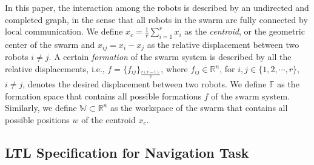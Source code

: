 \documentclass[letterpaper, 10 pt, conference]{ieeeconf}
\begin{document}
In this paper, the interaction among the robots is described by an undirected and completed graph, in the sense that all robots in the swarm are fully connected by local communication.
We define $x_c = \frac{1}{r} \sum_{i=1}^r x_i$ as the \textit{centroid}, or the geometric center of the swarm and $x_{ij} = x_{i}-x_{j}$ as the relative displacement between two robots $i \neq j$. A certain \textit{formation} of the swarm system is described by all the relative displacements, i.e., $f = \{f_{ij}\}_{\frac{r(r-1)}{2}}$, where $f_{ij} \in \mathbb{R}^n$, for $i,j\in\{1,2,\cdots,r\}$, $i\neq j$, denotes the desired displacement between two robots. We define $\mathbb{F}$ as the formation space that contains all possible formations $f$ of the swarm system. Similarly, we define $\mathbb W \subset \mathbb{R}^n$ as the workspace of the swarm that contains all possible positions $w$ of the centroid $x_c$.

\subsection{LTL Specification for Navigation Task}
\label{sec:ltl}
\end{document}
